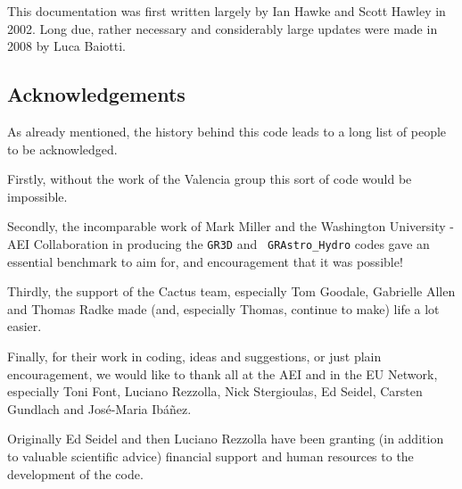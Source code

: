 \documentclass{article}
\begin{document}
This documentation was first written largely by Ian Hawke and Scott Hawley in 2002. Long due,
rather necessary and considerably large updates were made in 2008 by Luca Baiotti.


\subsection{Acknowledgements}

As already mentioned, the history behind this code leads to a long list
of people to be acknowledged.

Firstly, without the work of the Valencia group this sort of code
would be impossible. 

Secondly, the incomparable work of Mark Miller and the Washington
University - AEI Collaboration in producing the {\tt GR3D} and {\tt
GRAstro\_Hydro} codes gave an essential benchmark to aim for, and
encouragement that it was possible!

Thirdly, the support of the Cactus team, especially Tom Goodale,
Gabrielle Allen and Thomas Radke made (and, especially Thomas, continue to make) life a
lot easier.

Finally, for their work in coding, ideas and suggestions, or just
plain encouragement, we would like to thank all at the AEI and in the
EU Network, especially Toni Font, Luciano Rezzolla, Nick Stergioulas,
Ed Seidel, Carsten Gundlach and Jos\'e-Maria Ib{\'a}{\~n}ez.

Originally Ed Seidel and then Luciano Rezzolla have been granting (in addition to valuable
scientific advice) financial support and human resources to the development of the code.
\end{document}
